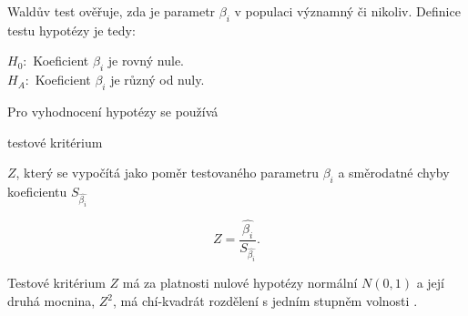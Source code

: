 Waldův test ověřuje, zda je parametr $\beta_i$ v populaci významný či nikoliv. Definice testu hypotézy je tedy:

$H_0:$ Koeficient $\beta_i$ je rovný nule. \\
$H_A:$ Koeficient $\beta_i$ je různý od nuly.

Pro vyhodnocení hypotézy se používá

testové kritérium

$Z$, který se vypočítá jako poměr testovaného parametru $\beta_i$
a směrodatné chyby koeficientu $S_{\hat{\beta_i}}$

\begin{equation*}
    Z = \frac{\hat{\beta_i}}{S_{\hat{\beta_i}}}.
\end{equation*}


Testové kritérium
$Z$ má za platnosti nulové hypotézy normální $N(0, 1)$ a její druhá mocnina, $Z^2$, má chí-kvadrát rozdělení s jedním stupněm volnosti \cite{kleinbaum_logistic_2010}.
